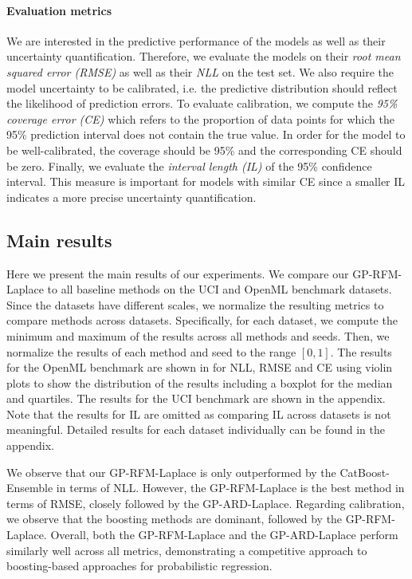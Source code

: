 \paragraph{Evaluation metrics}
We are interested in the predictive performance of the models as well as their uncertainty quantification.
Therefore, we evaluate the models on their \emph{root mean squared error (RMSE)} as well as their \emph{NLL} on the test set.
We also require the model uncertainty to be calibrated, i.e. the predictive distribution should reflect the likelihood of prediction errors.
To evaluate calibration, we compute the \emph{95\% coverage error (CE)} which refers to the proportion of data points for which the 95\% prediction interval does not contain the true value.
In order for the model to be well-calibrated, the coverage should be 95\% and the corresponding CE should be zero.
Finally, we evaluate the \emph{interval length (IL)} of the 95\% confidence interval. This measure is important for models with similar CE since a smaller IL indicates a more precise uncertainty quantification.








\subsection{Main results}
Here we present the main results of our experiments.
We compare our GP-RFM-Laplace to all baseline methods on the UCI and OpenML benchmark datasets.
Since the datasets have different scales, we normalize the resulting metrics to compare methods across datasets.
Specifically, for each dataset, we compute the minimum and maximum of the results across all methods and seeds.
Then, we normalize the results of each method and seed to the range $[0,1]$.
The results for the OpenML benchmark are shown in  for NLL, RMSE and CE
using violin plots to show the distribution of the results including a boxplot for the median and quartiles.
The results for the UCI benchmark are shown in the appendix.
Note that the results for IL are omitted as comparing IL across datasets is not meaningful.
Detailed results for each dataset individually can be found in the appendix.

We observe that our GP-RFM-Laplace is only outperformed by the CatBoost-Ensemble in terms of NLL.
However, the GP-RFM-Laplace is the best method in terms of RMSE, closely followed by the GP-ARD-Laplace.
Regarding calibration, we observe that the boosting methods are dominant, followed by the GP-RFM-Laplace.
Overall, both the GP-RFM-Laplace and the GP-ARD-Laplace perform similarly well across all metrics, demonstrating a competitive approach to boosting-based approaches for probabilistic regression.


